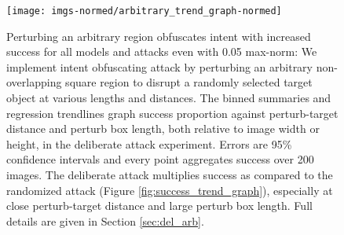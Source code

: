 \begin{figure}[tb]

{\centering \texttt{[image: imgs-normed/arbitrary\_trend\_graph-normed]} 

}

\caption{Perturbing an arbitrary region obfuscates intent with increased success for all models and attacks even with 0.05 max-norm:  We implement intent obfuscating attack by perturbing an arbitrary non-overlapping square region to disrupt a randomly selected target object at various lengths and distances. The binned summaries and regression trendlines graph success proportion against perturb-target distance and perturb box length, both relative to image width or height, in the deliberate attack experiment. Errors are 95\% confidence intervals and every point aggregates success over 200 images. The deliberate attack multiplies success as compared to the randomized attack (Figure \ref{fig:success_trend_graph}), especially at close perturb-target distance and large perturb box length. Full details are given in Section \ref{sec:del_arb}.}\label{fig:arbitrary_trend_graph_normed}
\end{figure}


